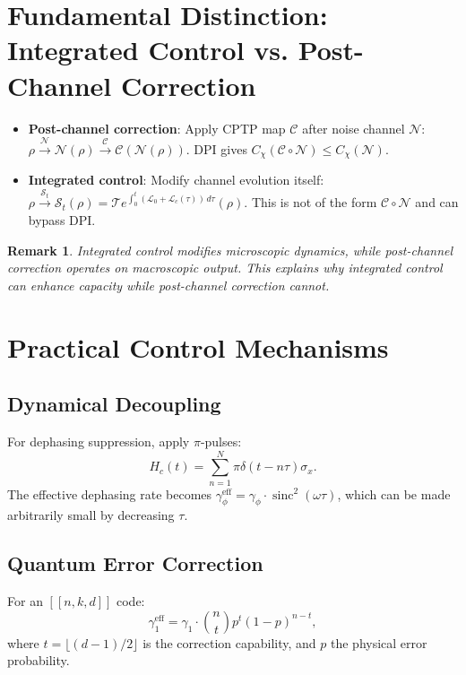 \documentclass[12pt]{article}
\newtheorem{remark}[theorem]{Remark}
\newcommand{\SJ}{\mathcal{S}}
\newcommand{\Lgen}{\mathcal{L}}
\newcommand{\T}{\mathcal{T}}
\DeclareMathOperator{\sinc}{sinc}
\begin{document}
\section{Fundamental Distinction: Integrated Control vs. Post-Channel Correction}
\begin{itemize}
    \item \textbf{Post-channel correction}: Apply CPTP map $\mathcal{C}$ after noise channel $\mathcal{N}$: $\rho \xrightarrow{\mathcal{N}} \mathcal{N}(\rho) \xrightarrow{\mathcal{C}} \mathcal{C}(\mathcal{N}(\rho))$. DPI gives $C_\chi(\mathcal{C} \circ \mathcal{N}) \leq C_\chi(\mathcal{N})$.
    \item \textbf{Integrated control}: Modify channel evolution itself: $\rho \xrightarrow{\SJ_t} \SJ_t(\rho) = \T e^{\int_0^t (\Lgen_0 + \Lgen_c(\tau)) \, d\tau}(\rho)$. This is not of the form $\mathcal{C} \circ \mathcal{N}$ and can bypass DPI.
\end{itemize}

\begin{remark}
    Integrated control modifies microscopic dynamics, while post-channel correction operates on macroscopic output. This explains why integrated control can enhance capacity while post-channel correction cannot.
\end{remark}

\section{Practical Control Mechanisms}
\subsection{Dynamical Decoupling}
For dephasing suppression, apply $\pi$-pulses:
\begin{equation}
    H_c(t) = \sum_{n=1}^N \pi \delta(t - n\tau) \sigma_x.
\end{equation}
The effective dephasing rate becomes $\gamma_\phi^{\text{eff}} = \gamma_\phi \cdot \sinc^2(\omega \tau)$, which can be made arbitrarily small by decreasing $\tau$.

\subsection{Quantum Error Correction}
For an $[[n,k,d]]$ code:
\begin{equation}
    \gamma_1^{\text{eff}} = \gamma_1 \cdot \binom{n}{t} p^t (1-p)^{n-t},
\end{equation}
where $t = \lfloor (d-1)/2 \rfloor$ is the correction capability, and $p$ the physical error probability.
\end{document}
